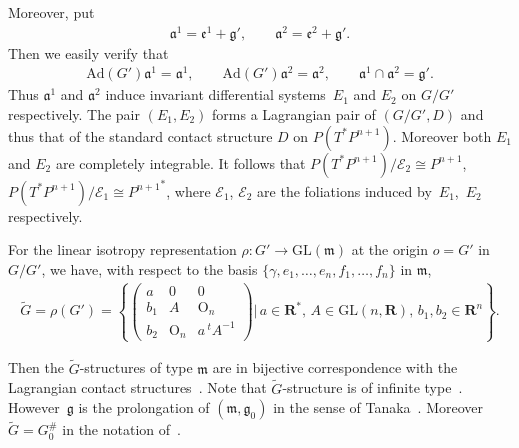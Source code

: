 Moreover, put
\begin{gather*}
\mathfrak{a}^1=\mathfrak{e}^1+\mathfrak{g}', \qquad
\mathfrak{a}^2=\mathfrak{e}^2+\mathfrak{g}'.
\end{gather*}
Then we easily verify that
\begin{gather*}
\mathrm{Ad}(G')\mathfrak{a}^1=\mathfrak{a}^1, \qquad
\mathrm{Ad}(G')\mathfrak{a}^2=\mathfrak{a}^2,\qquad
\mathfrak{a}^1\cap \mathfrak{a}^2=\mathfrak{g}'.
\end{gather*}
Thus $\mathfrak{a}^1$ and $\mathfrak{a}^2$ induce invariant
dif\/ferential systems~$E_1$ and $E_2$ on $G/G'$ respectively.
The pair $(E_1,E_2)$ forms
a Lagrangian pair of $(G/G', D)$ and thus
that of the standard contact structure $D$ on $P(T^*P^{n+1})$.
Moreover
both $E_1$ and $E_2$ are completely integrable.
It follows that
$P(T^*P^{n+1})/\mathcal{E}_2\cong P^{n+1}$, $P(T^*P^{n+1})/\mathcal{E}_1
\cong {P^{n+1}}^*$,
where
$\mathcal{E}_1$, $\mathcal{E}_2$ are the foliations induced by~$E_1$,~$E_2$
respectively.

For the linear isotropy representation
$\rho \colon  G' \longrightarrow \mathrm{GL}(\mathfrak{m})$ at the origin
$o = G'$ in $G/G'$,
we have, with respect to the basis $\{ \gamma, e_1, \dots, e_n, f_1, \dots, f_n \}$ in $\mathfrak{m}$,
\begin{gather*}
\tilde{G} =\rho(G')
          =\left\{{\begin{pmatrix}
                      a & 0 & 0 \\
                      b_1 & A & \mathrm{O}_n \\
                      b_2 & \mathrm{O}_n & a\, {}^t\! A^{-1}
                    \end{pmatrix}} \Bigg\vert \,
a\in \mathbf{R}^*,\, A\in \mathrm{GL}(n,{\mathbf{R}}), \,b_1, b_2\in \mathbf{R}^n
\right\}.
\end{gather*}

Then the $\tilde{G}$-structures of type $\mathfrak{m}$ are in bijective
correspondence with the Lagrangian contact structures~\cite[Theorem~5.1]{Tak}.
Note that $\tilde{G}$-structure is of inf\/inite type~\cite[Chapter~I]{K}.
How\-ever~${\mathfrak g}$ is the prolongation of $({\mathfrak m}, {\mathfrak g}_0)$
in the sense of Tanaka~\cite{Tan1,Y}. Moreover
$\tilde{G} = G_0^{\#}$ in the notation of~\cite{Tan}.
